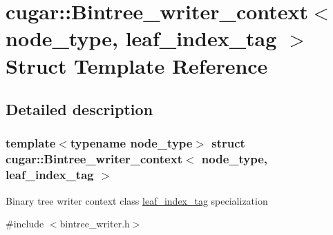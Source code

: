 \hypertarget{structcugar_1_1_bintree__writer__context_3_01node__type_00_01leaf__index__tag_01_4}{}\section{cugar\+:\+:Bintree\+\_\+writer\+\_\+context$<$ node\+\_\+type, leaf\+\_\+index\+\_\+tag $>$ Struct Template Reference}
\label{structcugar_1_1_bintree__writer__context_3_01node__type_00_01leaf__index__tag_01_4}


\subsection{Detailed description}
\subsubsection*{template$<$typename node\+\_\+type$>$\newline
struct cugar\+::\+Bintree\+\_\+writer\+\_\+context$<$ node\+\_\+type, leaf\+\_\+index\+\_\+tag $>$}

Binary tree writer context class \hyperlink{structcugar_1_1leaf__index__tag}{leaf\+\_\+index\+\_\+tag} specialization 

{\ttfamily \#include $<$bintree\+\_\+writer.\+h$>$}

